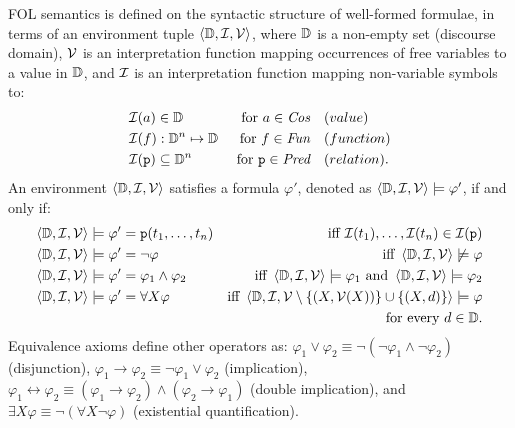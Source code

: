 FOL semantics is defined on the syntactic structure of well-formed formulae, in terms of an environment tuple $\left\langle{\mathbb{D}}, {\mathcal{I}}, {\mathcal{V}}\right\rangle$, where ${\mathbb{D}}$ is a non-empty set (discourse domain), ${\mathcal{V}}$ is an interpretation function mapping occurrences of free variables to a value in ${\mathbb{D}}$, and ${\mathcal{I}}$ is an interpretation function mapping non-variable symbols to:
\begin{align*}
	&{\mathcal{I}}(a) \in {\mathbb{D}} & \text{ for } a \in \textit{Cos} \quad &(value)\\
	&{\mathcal{I}}(f): {\mathbb{D}}^n \mapsto {\mathbb{D}} & \text{ for } f \in \textit{Fun}\quad & (function)\\
	&{\mathcal{I}}(\texttt{p}) \subseteq {\mathbb{D}}^n & \text{ for } \texttt{p} \in \textit{Pred}\quad & (relation).
\end{align*}
An environment $\left\langle{\mathbb{D}}, {\mathcal{I}}, {\mathcal{V}}\right\rangle$ satisfies a formula $\varphi'$, denoted as $\left\langle{\mathbb{D}}, {\mathcal{I}}, {\mathcal{V}}\right\rangle \models \varphi'$, if and only if:
\begin{align*}
	\left\langle{\mathbb{D}}, {\mathcal{I}}, {\mathcal{V}}\right\rangle &\models \varphi' = \texttt{p}(t_1, \dots, t_n) &\text{iff } {\mathcal{I}}(t_1), \dots, {\mathcal{I}}(t_n) \in {\mathcal{I}}(\texttt{p})\\
	\left\langle{\mathbb{D}}, {\mathcal{I}}, {\mathcal{V}}\right\rangle &\models \varphi' = \neg\varphi &\text{iff } \left\langle{\mathbb{D}}, {\mathcal{I}}, {\mathcal{V}}\right\rangle \not \models \varphi\\
	\left\langle{\mathbb{D}}, {\mathcal{I}}, {\mathcal{V}}\right\rangle &\models \varphi' = \varphi_1 \wedge \varphi_2 &\text{iff } \left\langle{\mathbb{D}}, {\mathcal{I}}, {\mathcal{V}}\right\rangle \models \varphi_1 \text{ and } \left\langle{\mathbb{D}}, {\mathcal{I}}, {\mathcal{V}}\right\rangle \models \varphi_2\\
	\left\langle{\mathbb{D}}, {\mathcal{I}}, {\mathcal{V}}\right\rangle &\models \varphi' = \forall X \varphi &\text{iff } \left\langle{\mathbb{D}}, {\mathcal{I}}, {\mathcal{V}} \setminus \left\{(X, {\mathcal{V}}(X))\right\} \cup \left\{(X, d)\right\} \right\rangle \models \varphi\\
	& & \text{for every } d \in {\mathbb{D}}.\\
\end{align*}
%
Equivalence axioms define other operators as: $\varphi_1 \vee \varphi_2 \equiv \neg (\neg \varphi_1 \wedge \neg \varphi_2)$ (disjunction), $\varphi_1 \rightarrow \varphi_2 \equiv \neg \varphi_1 \vee \varphi_2$ (implication), $\varphi_1 \leftrightarrow \varphi_2 \equiv (\varphi_1 \rightarrow \varphi_2) \wedge (\varphi_2 \rightarrow \varphi_1)$ (double implication), and $\exists X \varphi \equiv \neg (\forall X \neg \varphi)$ (existential quantification).

